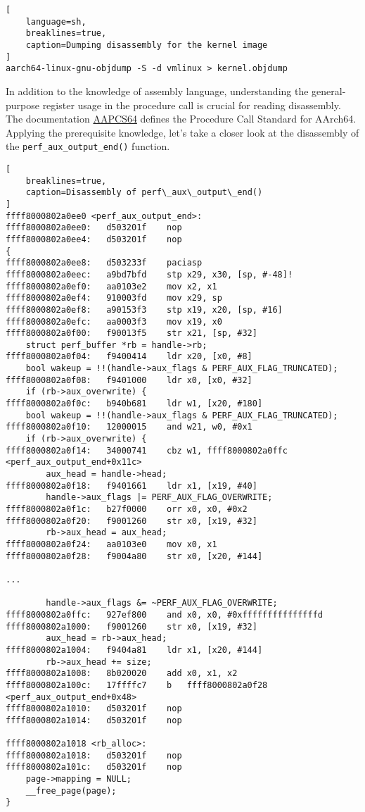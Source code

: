 \documentclass[11pt]{diazessay} %
\def\code#1{\texttt{#1}}
\begin{document}
\begin{lstlisting}[
  	language=sh,
	breaklines=true,
	caption=Dumping disassembly for the kernel image
]
aarch64-linux-gnu-objdump -S -d vmlinux > kernel.objdump
\end{lstlisting}

In addition to the knowledge of assembly language, understanding the
general-purpose register usage in the procedure call is crucial for reading
disassembly. The documentation
\href{https://github.com/ARM-software/abi-aa/releases/download/2023Q3/aapcs64.pdf}{AAPCS64}
defines the Procedure Call Standard for AArch64. Applying the prerequisite
knowledge, let’s take a closer look at the disassembly of the
\code{perf\_aux\_output\_end()} function.

\begin{lstlisting}[
	breaklines=true,
	caption=Disassembly of perf\_aux\_output\_end()
]
ffff8000802a0ee0 <perf_aux_output_end>:
ffff8000802a0ee0:	d503201f 	nop
ffff8000802a0ee4:	d503201f 	nop
{
ffff8000802a0ee8:	d503233f 	paciasp
ffff8000802a0eec:	a9bd7bfd 	stp	x29, x30, [sp, #-48]!
ffff8000802a0ef0:	aa0103e2 	mov	x2, x1
ffff8000802a0ef4:	910003fd 	mov	x29, sp
ffff8000802a0ef8:	a90153f3 	stp	x19, x20, [sp, #16]
ffff8000802a0efc:	aa0003f3 	mov	x19, x0
ffff8000802a0f00:	f90013f5 	str	x21, [sp, #32]
	struct perf_buffer *rb = handle->rb;
ffff8000802a0f04:	f9400414 	ldr	x20, [x0, #8]
	bool wakeup = !!(handle->aux_flags & PERF_AUX_FLAG_TRUNCATED);
ffff8000802a0f08:	f9401000 	ldr	x0, [x0, #32]
	if (rb->aux_overwrite) {
ffff8000802a0f0c:	b940b681 	ldr	w1, [x20, #180]
	bool wakeup = !!(handle->aux_flags & PERF_AUX_FLAG_TRUNCATED);
ffff8000802a0f10:	12000015 	and	w21, w0, #0x1
	if (rb->aux_overwrite) {
ffff8000802a0f14:	34000741 	cbz	w1, ffff8000802a0ffc <perf_aux_output_end+0x11c>
		aux_head = handle->head;
ffff8000802a0f18:	f9401661 	ldr	x1, [x19, #40]
		handle->aux_flags |= PERF_AUX_FLAG_OVERWRITE;
ffff8000802a0f1c:	b27f0000 	orr	x0, x0, #0x2
ffff8000802a0f20:	f9001260 	str	x0, [x19, #32]
		rb->aux_head = aux_head;
ffff8000802a0f24:	aa0103e0 	mov	x0, x1
ffff8000802a0f28:	f9004a80 	str	x0, [x20, #144]

...

		handle->aux_flags &= ~PERF_AUX_FLAG_OVERWRITE;
ffff8000802a0ffc:	927ef800 	and	x0, x0, #0xfffffffffffffffd
ffff8000802a1000:	f9001260 	str	x0, [x19, #32]
		aux_head = rb->aux_head;
ffff8000802a1004:	f9404a81 	ldr	x1, [x20, #144]
		rb->aux_head += size;
ffff8000802a1008:	8b020020 	add	x0, x1, x2
ffff8000802a100c:	17ffffc7 	b	ffff8000802a0f28 <perf_aux_output_end+0x48>
ffff8000802a1010:	d503201f 	nop
ffff8000802a1014:	d503201f 	nop

ffff8000802a1018 <rb_alloc>:
ffff8000802a1018:	d503201f 	nop
ffff8000802a101c:	d503201f 	nop
	page->mapping = NULL;
	__free_page(page);
}
\end{lstlisting}
\end{document}
